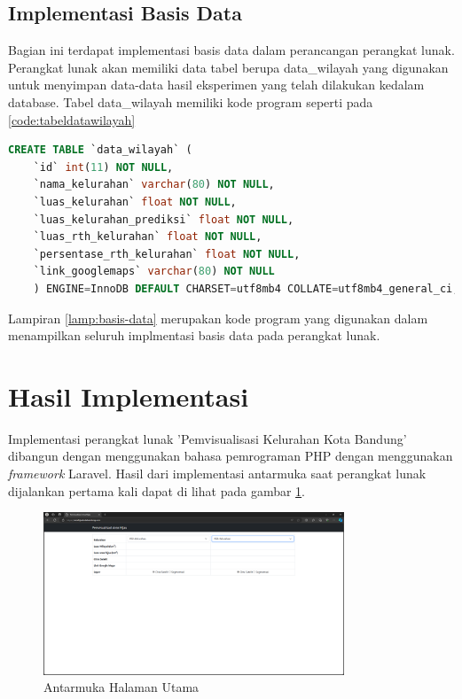 \subsection{Implementasi Basis Data}
\label{subsec:implmentasiBasisData}
Bagian ini terdapat implementasi basis data dalam perancangan perangkat lunak. Perangkat lunak akan memiliki data tabel berupa data\_wilayah yang digunakan untuk menyimpan data-data hasil eksperimen yang telah dilakukan kedalam database. Tabel data\_wilayah memiliki kode program seperti pada \ref{code:tabeldatawilayah}

\begin{lstlisting}[language=SQL, caption=Implementasi Tabel data\_wilayah,label={code:tabeldatawilayah}]
	CREATE TABLE `data_wilayah` (
	`id` int(11) NOT NULL,
	`nama_kelurahan` varchar(80) NOT NULL,
	`luas_kelurahan` float NOT NULL,
	`luas_kelurahan_prediksi` float NOT NULL,
	`luas_rth_kelurahan` float NOT NULL,
	`persentase_rth_kelurahan` float NOT NULL,
	`link_googlemaps` varchar(80) NOT NULL
	) ENGINE=InnoDB DEFAULT CHARSET=utf8mb4 COLLATE=utf8mb4_general_ci;
\end{lstlisting}

Lampiran \ref{lamp:basis-data} merupakan kode program yang digunakan dalam menampilkan seluruh implmentasi basis data pada perangkat lunak.

\section{Hasil Implementasi}
\label{sec:hasil-implementasi}
Implementasi perangkat lunak 'Pemvisualisasi Kelurahan Kota Bandung' dibangun dengan menggunakan bahasa pemrograman PHP dengan menggunakan \textit{framework} Laravel. Hasil  dari implementasi antarmuka saat perangkat lunak dijalankan pertama kali dapat di lihat pada gambar \ref{fig:home1}.
\begin{figure}[H]
	\centering
	\includegraphics[width=0.8\textwidth]{Gambar/home1new.png}
	\caption{Antarmuka Halaman Utama}
	\label{fig:home1}
\end{figure}

